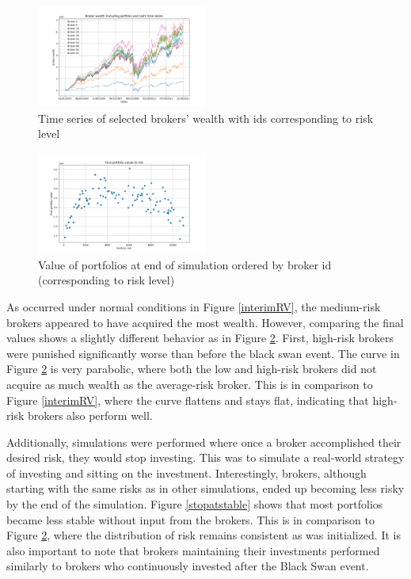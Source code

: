 \documentclass[letterpaper, 11 pt, proceedings]{IEEEtran}
\begin{document}
	\begin{figure}[h]
		\centering
		\includegraphics[width=0.5\textwidth]{timeSeriesJoint2.png}
		\caption{Time series of selected brokers' wealth with ids corresponding to risk level}
		\label{ts_03-12}
	\end{figure}
	\FloatBarrier


	\begin{figure}[h]
		\centering
		\includegraphics[width=0.5\textwidth]{valueToRisk.png}
		\caption{Value of portfolios at end of simulation ordered by broker id (corresponding to risk level)}
		\label{RV}
	\end{figure}
	\FloatBarrier

	As occurred under normal conditions in Figure \ref{interimRV}, the medium-risk brokers appeared to have acquired the most wealth. However, comparing the final values shows a slightly different behavior as in Figure \ref{RV}. First, high-risk brokers were punished significantly worse than before the black swan event. The curve in Figure \ref{RV} is very parabolic, where both the low and high-risk brokers did not acquire as much wealth as the average-risk broker. This is in comparison to Figure \ref{interimRV}, where the curve flattens and stays flat, indicating that high-risk brokers also perform well.
	
	Additionally, simulations were performed where once a broker accomplished their desired risk, they would stop investing. This was to simulate a real-world strategy of investing and sitting on the investment. Interestingly, brokers, although starting with the same risks as in other simulations, ended up becoming less risky by the end of the simulation. Figure \ref{stopatstable} shows that most portfolios became less stable without input from the brokers. This is in comparison to Figure \ref{RV}, where the distribution of risk remains consistent as was initialized. It is also important to note that brokers maintaining their investments performed similarly to brokers who continuously invested after the Black Swan event.
\end{document}
